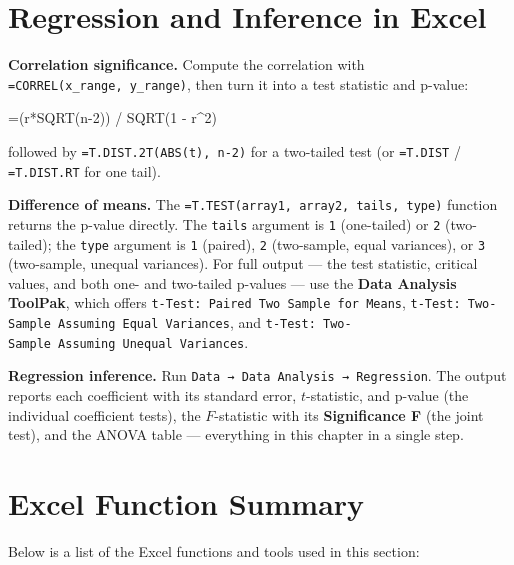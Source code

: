 \documentclass[
  11pt,
  letterpaper,
  DIV=11,
  numbers=noendperiod,
  oneside,
  open=any]{scrreprt}
\newenvironment{Shaded}{\begin{snugshade}}{\end{snugshade}}
\newcommand{\NormalTok}[1]{\textcolor[rgb]{0.00,0.23,0.31}{#1}}
\begin{document}
\section{Regression and Inference in
Excel}\label{regression-and-inference-in-excel}

\textbf{Correlation significance.} Compute the correlation with
\texttt{=CORREL(x\_range,\ y\_range)}, then turn it into a test
statistic and p-value:

\begin{Shaded}
\begin{Highlighting}[]
\NormalTok{=(r*SQRT(n{-}2)) / SQRT(1 {-} r\^{}2)}
\end{Highlighting}
\end{Shaded}

followed by \texttt{=T.DIST.2T(ABS(t),\ n-2)} for a two-tailed test (or
\texttt{=T.DIST} / \texttt{=T.DIST.RT} for one tail).

\textbf{Difference of means.} The
\texttt{=T.TEST(array1,\ array2,\ tails,\ type)} function returns the
p-value directly. The \texttt{tails} argument is \texttt{1} (one-tailed)
or \texttt{2} (two-tailed); the \texttt{type} argument is \texttt{1}
(paired), \texttt{2} (two-sample, equal variances), or \texttt{3}
(two-sample, unequal variances). For full output --- the test statistic,
critical values, and both one- and two-tailed p-values --- use the
\textbf{Data Analysis ToolPak}, which offers
\texttt{t-Test:\ Paired\ Two\ Sample\ for\ Means},
\texttt{t-Test:\ Two-Sample\ Assuming\ Equal\ Variances}, and
\texttt{t-Test:\ Two-Sample\ Assuming\ Unequal\ Variances}.

\textbf{Regression inference.} Run
\texttt{Data\ →\ Data\ Analysis\ →\ Regression}. The output reports each
coefficient with its standard error, \(t\)-statistic, and p-value (the
individual coefficient tests), the \(F\)-statistic with its
\textbf{Significance F} (the joint test), and the ANOVA table ---
everything in this chapter in a single step.

\section{Excel Function Summary}\label{excel-function-summary-11}

Below is a list of the Excel functions and tools used in this section:
\end{document}
